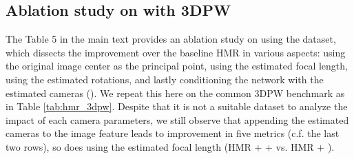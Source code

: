 \documentclass[10pt,twocolumn,letterpaper,usenames,dvipsnames]{article}
\begin{document}
\begin{table}[]
    \centering
    \caption{{\bf HPS optimization with an estimated camera.}  \smplify on the 3DPW validation set.}
    \label{tab:smplify_3dpw}
\end{table} 
\subsection{Ablation study on \methodname with 3DPW}
The Table 5 in the main text provides an ablation study on \methodname using the \agoracam dataset, 
which dissects the improvement over the baseline HMR in various aspects: using the original image center as the principal point, using the \camcalib estimated focal length, using the estimated rotations, and lastly conditioning the network with the estimated cameras (\methodname).
We repeat this here on the common 3DPW benchmark as in Table \ref{tab:hmr_3dpw}.
Despite that it is not a suitable dataset to analyze the impact of each camera parameters, we still observe that appending the estimated cameras to the image feature leads to improvement in five metrics (c.f. the last two rows), 
so does using the estimated focal length (HMR +  +  vs.  HMR + ).
\end{document}
